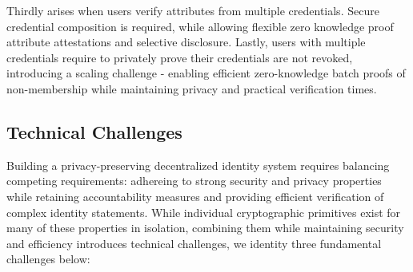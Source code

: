 \noindent Thirdly arises when users verify attributes from multiple credentials. Secure credential composition is required, while allowing flexible zero knowledge proof attribute attestations and selective disclosure. Lastly, users with multiple credentials require to privately prove their credentials are not revoked, introducing a scaling challenge - enabling efficient zero-knowledge batch proofs of non-membership while maintaining privacy and practical verification times. 




\subsection{Technical Challenges}

Building a privacy-preserving decentralized identity system requires balancing competing requirements: adhereing to strong security and privacy properties while retaining accountability measures and providing efficient verification of complex identity statements. While individual cryptographic primitives exist for many of these properties in isolation, combining them while maintaining security and efficiency introduces technical challenges, we identity three fundamental challenges below: 


